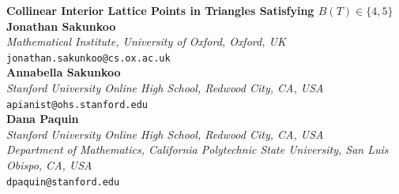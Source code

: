 \documentclass{article}
\theoremstyle{mydefstyle}
\begin{document}
\begin{center}
{\Large\bf Collinear Interior Lattice Points in Triangles Satisfying $B(T)\in\{4,5\}$}\\
\vskip 20pt
{\bf Jonathan Sakunkoo}\\
{\small\itshape Mathematical Institute, University of Oxford, Oxford, UK}\\
{\tt jonathan.sakunkoo@cs.ox.ac.uk}\\ %
\vskip 10pt
{\bf Annabella Sakunkoo}\\
{\small\itshape Stanford University Online High School, Redwood City, CA, USA}\\ %
{\tt apianist@ohs.stanford.edu}\\ %
\vskip 10pt
{\bf Dana Paquin}\\
{\small\itshape Stanford University Online High School, Redwood City, CA, USA}\\
{\small\itshape Department of Mathematics, California Polytechnic State University, San Luis Obispo, CA, USA}\\ %
{\tt dpaquin@stanford.edu}\\ %
\end{center}
\date{}
\end{document}
